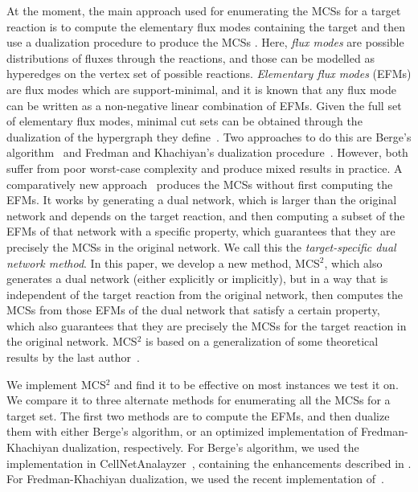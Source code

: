 \documentclass{bioinfo}
\theoremstyle{plain}
\theoremstyle{definition}
\begin{document}
At the moment, the main approach used for enumerating the MCSs for a target reaction is to compute the elementary flux modes containing the target and then use a dualization procedure to produce the MCSs \cite{MHS-survey}.  %
Here, \emph{flux modes} are possible distributions of fluxes through the reactions, and those can be modelled as hyperedges on the vertex set of possible reactions. \emph{Elementary flux modes} (EFMs) are flux modes which are support-minimal, and it is known that any flux mode can be written as a non-negative linear combination of EFMs. Given the full set of elementary flux modes, minimal cut sets can be obtained through the dualization of the hypergraph they define~\cite{MCS,Stephen}. Two approaches to do this are Berge's algorithm~\cite{Berge} and Fredman and Khachiyan's dualization procedure~\cite{FK}. However, both suffer from poor worst-case complexity and produce mixed results in practice. A comparatively new approach~\cite{Duality} produces the MCSs without first computing the EFMs. It works by generating a dual network, which is larger than the original network and depends on the target reaction, and then computing a subset of the EFMs of that network with a specific property, which guarantees that they are precisely the MCSs in the original network. We call this the \textit{target-specific dual network method}. In this paper, we develop a new method, MCS$^2$, which also generates a dual network (either explicitly or implicitly), but in a way that is independent of the target reaction from the original network, then computes the MCSs from those EFMs of the dual network that satisfy a certain property, which also guarantees that they are precisely the MCSs for the target reaction in the original network. MCS$^2$ is based on a generalization of some theoretical results by the last author~\cite{Thesis}.

We implement MCS$^{2}$ and find it to be effective on most instances we test it on. We compare it to three alternate methods for enumerating all the MCSs for a target set.
The first two methods are to compute the EFMs, and then dualize them with either Berge's algorithm, or an optimized implementation of Fredman-Khachiyan dualization, respectively. For Berge's algorithm, we used the implementation in CellNetAnalayzer~\cite{Cellnet}, containing the enhancements described in \cite{Stephen, Dualization}. For Fredman-Khachiyan dualization, we used the recent implementation of~\cite{Nafiseh}. 
\end{document}
